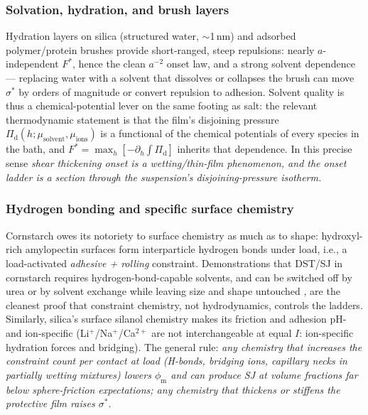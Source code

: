 \documentclass[11pt]{article}
\newcommand{\phiM}{\phi_{\mathrm{m}}}
\newcommand{\sigmastar}{\sigma^{*}}
\newcommand{\Fstar}{F^{*}}
\begin{document}
\subsubsection{Solvation, hydration, and brush layers}
Hydration layers on silica (structured water, $\sim$1\,nm) and adsorbed polymer/protein brushes provide short-ranged, steep repulsions: nearly $a$-independent $\Fstar$, hence the clean $a^{-2}$ onset law, and a strong solvent dependence --- replacing water with a solvent that dissolves or collapses the brush can move $\sigmastar$ by orders of magnitude or convert repulsion to adhesion. Solvent quality is thus a chemical-potential lever on the same footing as salt: the relevant thermodynamic statement is that the film's disjoining pressure $\Pi_{\mathrm{d}}(h;\mu_{\mathrm{solvent}}, \mu_{\mathrm{ions}})$ is a functional of the chemical potentials of every species in the bath, and $\Fstar = \max_h [-\partial_h \int \Pi_{\mathrm{d}}]$ inherits that dependence. In this precise sense \emph{shear thickening onset is a wetting/thin-film phenomenon, and the onset ladder is a section through the suspension's disjoining-pressure isotherm.}

\subsubsection{Hydrogen bonding and specific surface chemistry}
Cornstarch owes its notoriety to surface chemistry as much as to shape: hydroxyl-rich amylopectin surfaces form interparticle hydrogen bonds under load, i.e., a load-activated \emph{adhesive + rolling} constraint. Demonstrations that DST/SJ in cornstarch requires hydrogen-bond-capable solvents, and can be switched off by urea or by solvent exchange while leaving size and shape untouched \cite{james2018}, are the cleanest proof that constraint chemistry, not hydrodynamics, controls the ladders. Similarly, silica's surface silanol chemistry makes its friction and adhesion pH- and ion-specific (Li$^+$/Na$^+$/Ca$^{2+}$ are not interchangeable at equal $I$: ion-specific hydration forces and bridging). The general rule: \emph{any chemistry that increases the constraint count per contact at load (H-bonds, bridging ions, capillary necks in partially wetting mixtures) lowers $\phiM$ and can produce SJ at volume fractions far below sphere-friction expectations; any chemistry that thickens or stiffens the protective film raises $\sigmastar$.}
\end{document}
